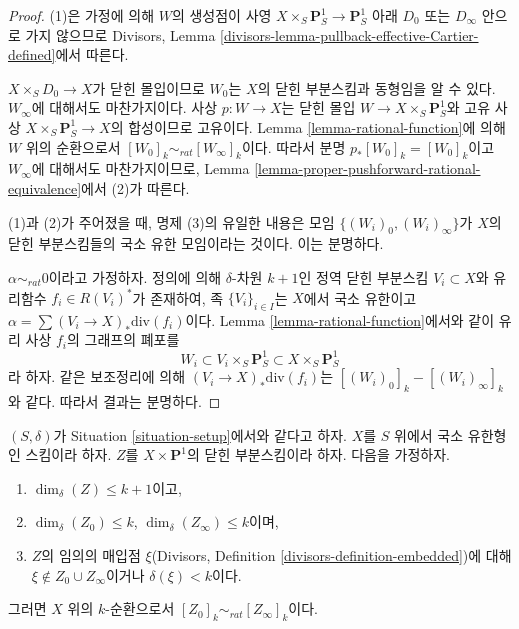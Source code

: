 \begin{proof}
(1)은 가정에 의해 $W$의 생성점이 사영
$X \times_S \mathbf{P}^1_S \to \mathbf{P}^1_S$ 아래 $D_0$ 또는
$D_\infty$ 안으로 가지 않으므로 Divisors, Lemma
\ref{divisors-lemma-pullback-effective-Cartier-defined}에서 따른다.

\medskip\noindent
$X \times_S D_0 \to X$가 닫힌 몰입이므로 $W_0$는 $X$의 닫힌
부분스킴과 동형임을 알 수 있다. $W_\infty$에 대해서도 마찬가지이다.
사상 $p : W \to X$는 닫힌 몰입 $W \to X \times_S \mathbf{P}^1_S$와
고유 사상 $X \times_S \mathbf{P}^1_S \to X$의 합성이므로 고유이다.
Lemma \ref{lemma-rational-function}에 의해 $W$ 위의 순환으로서
$[W_0]_k \sim_{rat} [W_\infty]_k$이다. 따라서 분명
$p_*[W_0]_k = [W_0]_k$이고 $W_\infty$에 대해서도 마찬가지이므로,
Lemma \ref{lemma-proper-pushforward-rational-equivalence}에서 (2)가
따른다.

\medskip\noindent
(1)과 (2)가 주어졌을 때, 명제 (3)의 유일한 내용은 모임
$\{(W_i)_0, (W_i)_\infty\}$가 $X$의 닫힌 부분스킴들의 국소 유한
모임이라는 것이다. 이는 분명하다.

\medskip\noindent
$\alpha \sim_{rat} 0$이라고 가정하자. 정의에 의해
$\delta$-차원 $k + 1$인 정역 닫힌 부분스킴 $V_i \subset X$와 유리함수
$f_i \in R(V_i)^*$가 존재하여, 족 $\{V_i\}_{i \in I}$는 $X$에서 국소
유한이고 $\alpha = \sum (V_i \to X)_*\text{div}(f_i)$이다. Lemma
\ref{lemma-rational-function}에서와 같이 유리 사상 $f_i$의 그래프의
폐포를
$$
W_i \subset V_i \times_S \mathbf{P}^1_S \subset X \times_S \mathbf{P}^1_S
$$
라 하자. 같은 보조정리에 의해 $(V_i \to X)_*\text{div}(f_i)$는
$[(W_i)_0]_k - [(W_i)_\infty]_k$와 같다. 따라서 결과는 분명하다.
\end{proof}

\begin{lemma}
\label{lemma-closed-subscheme-cross-p1}
$(S, \delta)$가 Situation \ref{situation-setup}에서와 같다고 하자.
$X$를 $S$ 위에서 국소 유한형인 스킴이라 하자.
$Z$를 $X \times \mathbf{P}^1$의 닫힌 부분스킴이라 하자. 다음을
가정하자.
\begin{enumerate}
\item $\dim_\delta(Z) \leq k + 1$이고,
\item $\dim_\delta(Z_0) \leq k$, $\dim_\delta(Z_\infty) \leq k$이며,
\item $Z$의 임의의 매입점 $\xi$(Divisors, Definition
\ref{divisors-definition-embedded})에 대해
$\xi \not \in Z_0 \cup Z_\infty$이거나 $\delta(\xi) < k$이다.
\end{enumerate}
그러면 $X$ 위의 $k$-순환으로서
$[Z_0]_k \sim_{rat} [Z_\infty]_k$이다.
\end{lemma}

